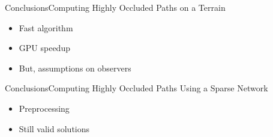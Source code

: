 \begin{frame}{Conclusions}{Computing Highly Occluded Paths on a Terrain}
	\begin{itemize}
		\item Fast algorithm
		\item GPU speedup
		\item But, assumptions on observers
	\end{itemize}
\end{frame}

\begin{frame}{Conclusions}{Computing Highly Occluded Paths Using a Sparse Network}
	\begin{itemize}
		\item Preprocessing
		\item Still valid solutions
	\end{itemize}
\end{frame}
